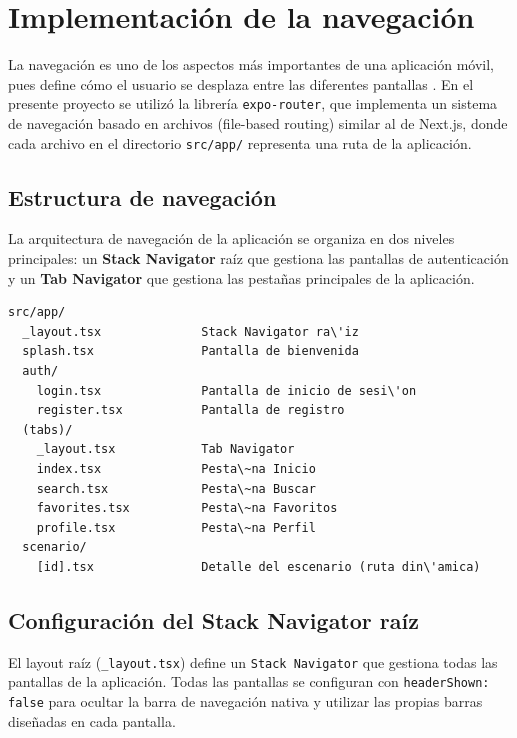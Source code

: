
\section{Implementaci\'on de la navegaci\'on}

La navegaci\'on es uno de los aspectos m\'as importantes de una
aplicaci\'on m\'ovil, pues define c\'omo el usuario se desplaza entre las
diferentes pantallas \citep{pressman2010}. En el presente proyecto se
utiliz\'o la librer\'ia \texttt{expo-router}, que implementa un sistema de
navegaci\'on basado en archivos (file-based routing) similar al de Next.js,
donde cada archivo en el directorio \texttt{src/app/} representa una ruta de
la aplicaci\'on.

\subsection{Estructura de navegaci\'on}

La arquitectura de navegaci\'on de la aplicaci\'on se organiza en dos
niveles principales: un \textbf{Stack Navigator} ra\'iz que gestiona las
pantallas de autenticaci\'on y un \textbf{Tab Navigator} que gestiona las
pesta\~nas principales de la aplicaci\'on.

\begin{lstlisting}
src/app/
  _layout.tsx              Stack Navigator ra\'iz
  splash.tsx               Pantalla de bienvenida
  auth/
    login.tsx              Pantalla de inicio de sesi\'on
    register.tsx           Pantalla de registro
  (tabs)/
    _layout.tsx            Tab Navigator
    index.tsx              Pesta\~na Inicio
    search.tsx             Pesta\~na Buscar
    favorites.tsx          Pesta\~na Favoritos
    profile.tsx            Pesta\~na Perfil
  scenario/
    [id].tsx               Detalle del escenario (ruta din\'amica)
\end{lstlisting}

\subsection{Configuraci\'on del Stack Navigator ra\'iz}

El layout ra\'iz (\texttt{\_layout.tsx}) define un \texttt{Stack Navigator}
que gestiona todas las pantallas de la aplicaci\'on. Todas las pantallas se
configuran con \texttt{headerShown: false} para ocultar la barra de
navegaci\'on nativa y utilizar las propias barras dise\~nadas en cada pantalla.

